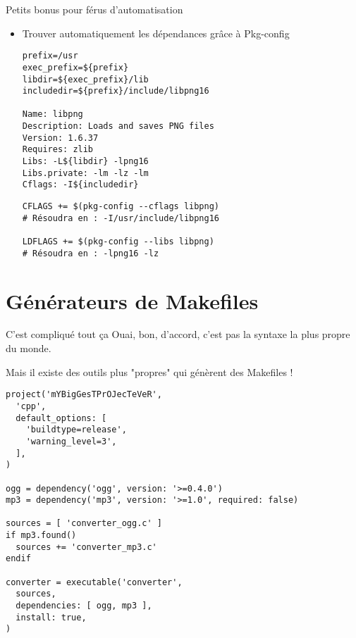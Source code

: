 \begin{frame}[fragile]{Petits bonus pour férus d'automatisation}
\begin{itemize}
\item Trouver automatiquement les dépendances grâce à Pkg-config
\begin{lstlisting}[title=\texttt{/usr/lib/pkgconfig/libpng.pc}]
prefix=/usr
exec_prefix=${prefix}
libdir=${exec_prefix}/lib
includedir=${prefix}/include/libpng16

Name: libpng
Description: Loads and saves PNG files
Version: 1.6.37
Requires: zlib
Libs: -L${libdir} -lpng16
Libs.private: -lm -lz -lm 
Cflags: -I${includedir}
\end{lstlisting}

\begin{lstlisting}[title=Code du makefile]
CFLAGS += $(pkg-config --cflags libpng)
# Résoudra en : -I/usr/include/libpng16

LDFLAGS += $(pkg-config --libs libpng)
# Résoudra en : -lpng16 -lz
\end{lstlisting}
\end{itemize}
\end{frame}

\section{Générateurs de Makefiles}
\begin{frame}[fragile]{C'est compliqué tout ça\…}
Ouai, bon, d'accord, c'est pas la syntaxe la plus propre du monde.

\… Mais il existe des outils plus "propres" qui génèrent des Makefiles !
\begin{lstlisting}
project('mYBigGesTPrOJecTeVeR',
  'cpp',
  default_options: [
    'buildtype=release',
    'warning_level=3',
  ],
)

ogg = dependency('ogg', version: '>=0.4.0')
mp3 = dependency('mp3', version: '>=1.0', required: false)

sources = [ 'converter_ogg.c' ]
if mp3.found()
  sources += 'converter_mp3.c'
endif

converter = executable('converter',
  sources,
  dependencies: [ ogg, mp3 ],
  install: true,
)
  
\end{lstlisting}
\end{frame}

